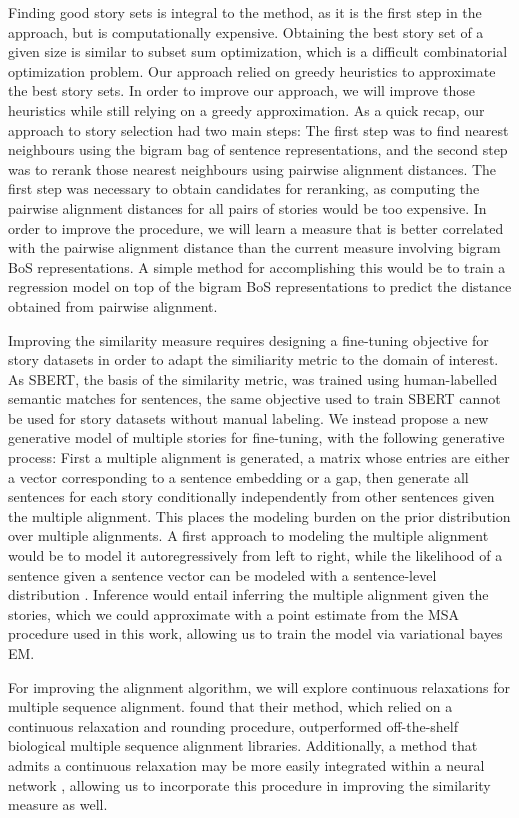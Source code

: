 \documentclass{article}
\begin{document}
Finding good story sets is integral to the method,
as it is the first step in the approach, but is computationally expensive.
Obtaining the best story set of a given size
is similar to subset sum optimization,
which is a difficult combinatorial optimization problem.
Our approach relied on greedy heuristics to approximate the best story sets.
In order to improve our approach, we will improve those heuristics
while still relying on a greedy approximation.
As a quick recap, our approach to story selection had two main steps:
The first step was to find nearest neighbours using the bigram bag of sentence representations,
and the second step was to rerank those nearest neighbours using pairwise alignment distances.
The first step was necessary to obtain candidates for reranking, as computing the pairwise
alignment distances for all pairs of stories would be too expensive.
In order to improve the procedure, we will learn a measure that is better correlated
with the pairwise alignment distance than the current measure involving bigram BoS representations.
A simple method for accomplishing this would be to train a regression model on top of the
bigram BoS representations to predict the distance obtained from pairwise alignment.

Improving the similarity measure requires designing a fine-tuning objective for story datasets
in order to adapt the similiarity metric to the domain of interest.
As SBERT, the basis of the similarity metric, was trained using human-labelled
semantic matches for sentences,
the same objective used to train SBERT cannot be used for story datasets without manual labeling.
We instead propose a new generative model of multiple stories for fine-tuning,
with the following generative process:
First a multiple alignment is generated,
a matrix whose entries are either a vector corresponding to a sentence embedding or a gap,
then generate all sentences for each story 
conditionally independently from other sentences given the multiple alignment.
This places the modeling burden on the prior distribution over multiple alignments.
A first approach to modeling the multiple alignment would be to model it
autoregressively from left to right, while the likelihood of a sentence given a sentence 
vector can be modeled with a sentence-level distribution \citep{ippolito2020better}.
Inference would entail inferring the multiple alignment given the stories,
which we could approximate with a point estimate from the MSA procedure used in this work,
allowing us to train the model via variational bayes EM.

For improving the alignment algorithm, we will explore continuous relaxations for
multiple sequence alignment.
\citet{alayrac2015align} found that their method, which relied on a continuous relaxation
and rounding procedure, outperformed off-the-shelf biological multiple sequence alignment libraries.
Additionally, a method that admits a continuous relaxation may be more easily integrated within
a neural network \citep{paulus2020gradient}, allowing us to incorporate this procedure
in improving the similarity measure as well.

\newpage


\end{document}
